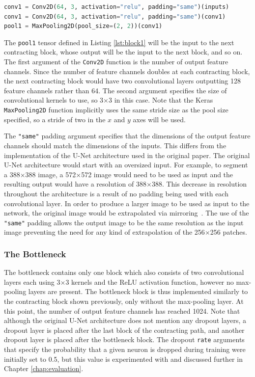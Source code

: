 \begin{lstlisting}[float={!t},caption={The implementation of the first contracting block of the U-Net architecture using the Keras functional API.},label={lst:block1},language=Python,upquote=true,belowskip=0pt]
conv1 = Conv2D(64, 3, activation="relu", padding="same")(inputs)
conv1 = Conv2D(64, 3, activation="relu", padding="same")(conv1)
pool1 = MaxPooling2D(pool_size=(2, 2))(conv1)
\end{lstlisting}
The \texttt{pool1} tensor defined in Listing \ref{lst:block1} will be the input to the next contracting block, whose output will be the input to the next block, and so on. The first argument of the \texttt{Conv2D} function is the number of output feature channels. Since the number of feature channels doubles at each contracting block, the next contracting block would have two convolutional layers outputting 128 feature channels rather than 64. The second argument specifies the size of convolutional kernels to use, so 3$\times$3 in this case. Note that the Keras \texttt{MaxPooling2D} function implicitly uses the same stride size as the pool size specified, so a stride of two in the $x$ and $y$ axes will be used.

The \texttt{"{}same"{}} padding argument specifies that the dimensions of the output feature channels should match the dimensions of the inputs. This differs from the implementation of the U-Net architecture used in the original paper. The original U-Net architecture would start with an oversized input. For example, to segment a 388$\times$388 image, a 572$\times$572 image would need to be used as input and the resulting output would have a resolution of 388$\times$388. This decrease in resolution throughout the architecture is a result of no padding being used with each convolutional layer. In order to produce a larger image to be used as input to the network, the original image would be extrapolated via mirroring~\cite{ronneberger2015u}. The use of the \texttt{"{}same"{}} padding allows the output image to be the same resolution as the input image preventing the need for any kind of extrapolation of the 256$\times$256 patches.

\subsubsection{The Bottleneck}

The bottleneck contains only one block which also consists of two convolutional layers each using 3$\times$3 kernels and the ReLU activation function, however no max-pooling layers are present. The bottleneck block is thus implemented similarly to the contracting block shown previously, only without the max-pooling layer. At this point, the number of output feature channels has reached 1024. Note that although the original U-Net architecture does not mention any dropout layers, a dropout layer is placed after the last block of the contracting path, and another dropout layer is placed after the bottleneck block. The dropout \texttt{rate} arguments that specify the probability that a given neuron is dropped during training were initially set to 0.5, but this value is experimented with and discussed further in Chapter \ref{chap:evaluation}.

